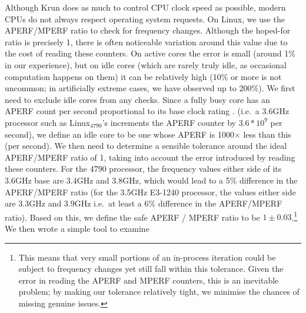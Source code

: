 \documentclass[acmsmall]{acmart}\settopmatter{printfolios=true}
\newcommand{\krun}{Krun\xspace}
\newcommand{\bencherfive}{Linux$_\mathrm{4790}$\xspace}
\begin{document}
Although \krun does as much to control CPU clock speed as possible, modern CPUs
do not always respect operating system requests. On Linux, we use the
APERF/MPERF ratio to check for frequency changes. Although the hoped-for
ratio is precisely 1, there is often noticeable variation around this value due to the
cost of reading these counters. On active cores the error is small (around 1\% in our
experience), but on idle cores (which are rarely truly idle, as occasional
computation happens on them) it can be relatively high (10\% or more is
not uncommon; in artificially extreme cases, we have observed up to 200\%).
We first need to exclude idle cores from any checks. Since a fully busy core has
an APERF count per second proportional to its base clock rating  . (i.e.~a 3.6GHz processor
such as \bencherfive's increments the APERF counter by $3.6*10^9$ per second),
we define an idle core to be one whose APERF is 1000$\times$ less than this (per
second). We then need to determine a sensible tolerance around the ideal APERF/MPERF ratio of 1,
taking into account the error introduced by reading these counters.
For the 4790 processor, the frequency values either side of its 3.6GHz base
are 3.4GHz and 3.8GHz, which would lead to a 5\% difference in the APERF/MPERF
ratio (for the 3.5GHz E3-1240 processor, the values either side are 3.3GHz and 3.9GHz i.e.~at
least a 6\% difference in the APERF/MPERF ratio). Based on this, we define the
safe APERF / MPERF ratio to be $1\pm0.03$.\footnote{This means that very small
portions of an in-process iteration could be subject to frequency changes yet still fall within
this tolerance. Given the error in reading the APERF and MPERF counters, this is an
inevitable problem; by making our tolerance relatively tight, we minimise the
chances of missing genuine issues.} We then wrote a simple tool to examine
\end{document}
